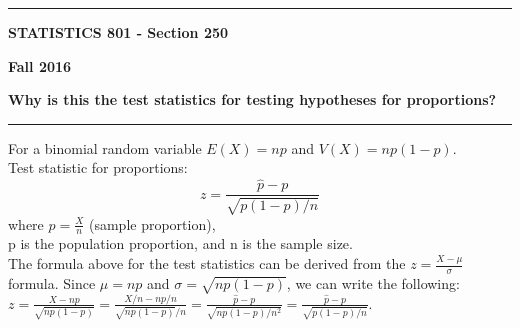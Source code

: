 \documentclass[12pt]{article}
\begin{document}
\hrule
\medskip
\centerline{\textbf{STATISTICS 801 - Section 250}}\hfill \textbf{Fall 2016}
\centerline{\textbf{Why is this the test statistics for testing hypotheses for proportions?}}
\smallskip
\hrule
For a binomial random variable $E(X)=np$ and $V(X)=np(1-p)$.\\
Test statistic for proportions:\\
\begin{equation}
z=\frac{\hat{p}-p}{\sqrt{p(1-p)/n}}
\end{equation}
where $\hat{p}=\frac{X}{n}$ (sample proportion),\\
p is the population proportion, and n is the sample size.\\
The formula above for the test statistics can be derived from the $z=\frac{X-\mu}{\sigma}$ formula. Since $\mu=np$ and $\sigma=\sqrt{np(1-p)}$, we can write the following:\\
$z=\frac{X-np}{\sqrt{np(1-p)}}=\frac{X/n-np/n}{\sqrt{np(1-p)}/n}=\frac{\hat{p}-p}{\sqrt{np(1-p)/n^2}}=\frac{\hat{p}-p}{\sqrt{p(1-p)/n}}$.
\end{document}
